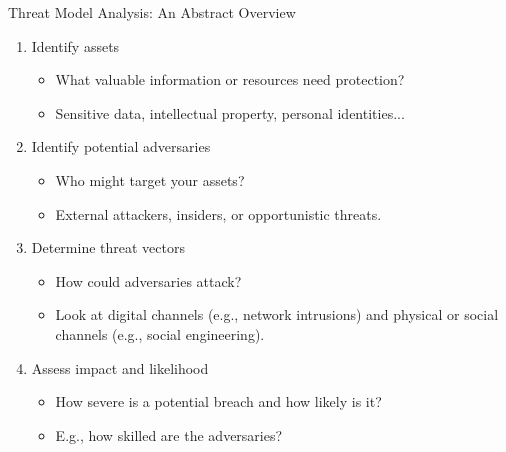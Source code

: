 \documentclass[aspectratio=169]{beamer}
\renewcommand{\emph}[1]{{\color{magenta}#1}}
\begin{document}
\begin{frame}{Threat Model Analysis: An Abstract Overview}\pause
  \begin{enumerate}
    \item Identify \emph{assets}
      \begin{itemize}
        \item What valuable information or resources need protection?
        \item[] Sensitive data, intellectual property, personal identities...
      \end{itemize}
    \item Identify \emph{potential adversaries}
      \begin{itemize}
        \item Who might target your assets?
        \item[] External attackers, insiders, or opportunistic threats.
      \end{itemize}
    \item Determine \emph{threat vectors}
      \begin{itemize}
        \item How could adversaries attack?
        \item[] Look at digital channels (e.g., network intrusions) and physical or social channels (e.g., social engineering).
      \end{itemize}
    \item Assess \emph{impact} and \emph{likelihood}
      \begin{itemize}
        \item How severe is a potential breach and how likely is it?
        \item[] E.g., how skilled are the adversaries?
      \end{itemize}
  \end{enumerate}
\end{frame}
\end{document}
